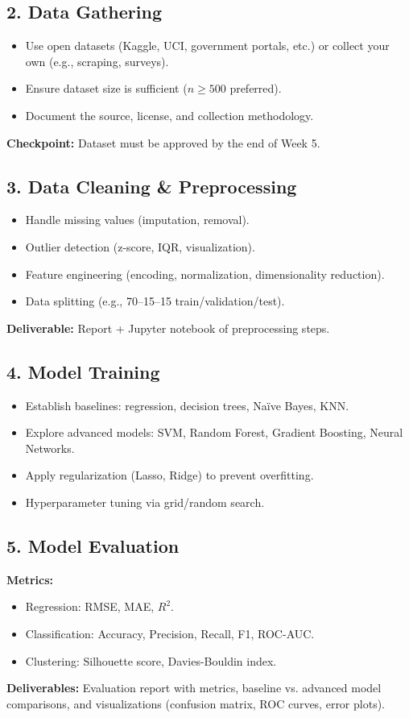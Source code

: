 \documentclass[a4paper,10pt]{article}
\begin{document}
\subsection*{2. Data Gathering}
\begin{itemize}
    \item Use open datasets (Kaggle, UCI, government portals, etc.) or collect your own (e.g., scraping, surveys).
    \item Ensure dataset size is sufficient ($n \geq 500$ preferred).
    \item Document the source, license, and collection methodology.
\end{itemize}
\textbf{Checkpoint:} Dataset must be approved by the end of Week 5.

\subsection*{3. Data Cleaning \& Preprocessing}
\begin{itemize}
    \item Handle missing values (imputation, removal).
    \item Outlier detection (z-score, IQR, visualization).
    \item Feature engineering (encoding, normalization, dimensionality reduction).
    \item Data splitting (e.g., 70--15--15 train/validation/test).
\end{itemize}
\textbf{Deliverable:} Report + Jupyter notebook of preprocessing steps.

\subsection*{4. Model Training}
\begin{itemize}
    \item Establish baselines: regression, decision trees, Naïve Bayes, KNN.
    \item Explore advanced models: SVM, Random Forest, Gradient Boosting, Neural Networks.
    \item Apply regularization (Lasso, Ridge) to prevent overfitting.
    \item Hyperparameter tuning via grid/random search.
\end{itemize}


\subsection*{5. Model Evaluation}
\textbf{Metrics:}
\begin{itemize}
    \item Regression: RMSE, MAE, $R^2$.
    \item Classification: Accuracy, Precision, Recall, F1, ROC-AUC.
    \item Clustering: Silhouette score, Davies-Bouldin index.
\end{itemize}
\textbf{Deliverables:} Evaluation report with metrics, baseline vs. advanced model comparisons, and visualizations (confusion matrix, ROC curves, error plots).
\end{document}
